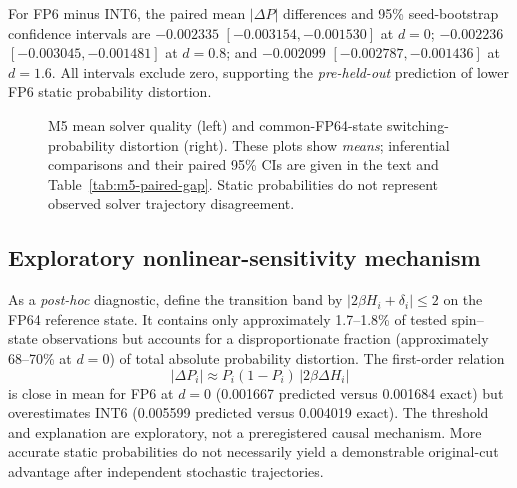 For FP6 minus INT6, the paired mean $|\Delta P|$ differences
and 95\% seed-bootstrap confidence intervals are
$-0.002335$ $[-0.003154,-0.001530]$ at $d=0$;
$-0.002236$ $[-0.003045,-0.001481]$ at $d=0.8$;
and $-0.002099$ $[-0.002787,-0.001436]$ at $d=1.6$.
All intervals exclude zero, supporting the \emph{pre-held-out}
prediction of lower FP6 static probability distortion.

\begin{figure}[htbp]\centering
{}
\caption{M5 mean solver quality (left) and common-FP64-state
switching-probability distortion (right). These plots show
\emph{means}; inferential comparisons and their paired 95\% CIs
are given in the text and Table~\ref{tab:m5-paired-gap}.
Static probabilities do not represent observed solver
trajectory disagreement.}
\label{fig:m5-quality-fidelity}
\end{figure}

\subsection{Exploratory nonlinear-sensitivity mechanism}
As a \emph{post-hoc} diagnostic, define the transition band by
$|2\beta H_i+\delta_i|\leq2$ on the FP64 reference state.
It contains only approximately 1.7--1.8\% of tested spin--state
observations but accounts for a disproportionate fraction
(approximately 68--70\% at $d=0$) of total absolute
probability distortion. The first-order relation
\[
|\Delta P_i|\approx P_i(1-P_i)\,|2\beta\Delta H_i|
\]
is close in mean for FP6 at $d=0$ (0.001667 predicted versus
0.001684 exact) but overestimates INT6 (0.005599 predicted
versus 0.004019 exact). The threshold and explanation are
exploratory, not a preregistered causal mechanism.
More accurate static probabilities do not necessarily yield
a demonstrable original-cut advantage after independent
stochastic trajectories.

